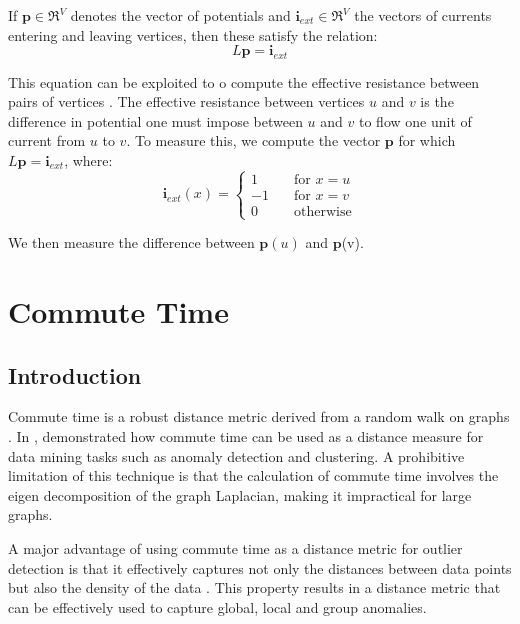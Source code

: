 If $\textbf{p} \in \Re^{V}$ denotes the vector of potentials and 
$\textbf{i}_{ext} \in \Re^{V}$ the vectors of currents entering and leaving 
vertices, then these satisfy the relation:
\begin{equation}
L\textbf{p} = \textbf{i}_{ext}
\end{equation}

This equation can be exploited to o compute the effective resistance between 
pairs of vertices \cite{Speilman:2010}. The effective resistance between 
vertices $u$ and $v$ is the difference in potential one must impose between $u$ 
and $v$ to flow one unit of current from $u$ to $v$. To measure this, we compute
the vector $\textbf{p}$ for which $L\textbf{p} = \textbf{i}_{ext}$, where:
\begin{equation}
\textbf{i}_{ext}(x) =
	\left\{
        \begin{array}{ll}
            1 &   	\quad \text{for $x=u$} \\
            -1 & 	\quad \text{for $x=v$} \\
            0 &		\quad \text{otherwise}
        \end{array}
    \right.
\end{equation}

We then measure the difference between $\textbf{p}(u)$ and $\textbf{p}$(v).

\section{Commute Time}
\label{sec:commuteTime}

\subsection{Introduction}
\label{sec:commuteTimeIntroduction}
Commute time is a robust distance metric derived from a random walk on graphs 
\cite{Khoa:2012}. In , \citeauthor{Khoa:2012} demonstrated 
how commute time can be used as a distance measure for data mining tasks such as
anomaly detection and clustering. A prohibitive limitation of this technique is 
that the calculation of commute time involves the eigen decomposition of the 
graph Laplacian, making it impractical for large graphs.

A major advantage of using commute time as a distance metric for outlier 
detection is that it effectively captures not only the distances between data 
points but also the density of the data \citeneeded{}. This property results in 
a distance metric that can be effectively used to capture global, local and 
group anomalies.

